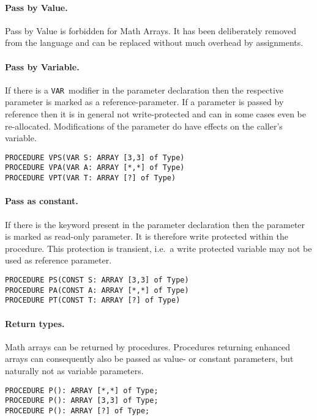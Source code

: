 \documentclass[a4wide,11pt]{article}
\newcommand{\pc}[1]{\makebox{\tt#1}}
\newcommand{\VAR}{\lstinline"VAR"}
\begin{document}
\paragraph{Pass by Value.}
Pass by Value is forbidden for Math Arrays.
It has been deliberately removed from the language and can be replaced without much overhead by assignments.

\paragraph{Pass by Variable.} If there is a \VAR\ modifier in the parameter declaration then  the respective parameter is marked as a reference-parameter.
If a parameter is passed by reference then it is in general not write-protected and can in some cases even be re-allocated.
Modifications of the parameter do have effects on the caller's variable.

\begin{lstlisting}[style=example]
PROCEDURE VPS(VAR S: ARRAY [3,3] of Type)
PROCEDURE VPA(VAR A: ARRAY [*,*] of Type)
PROCEDURE VPT(VAR T: ARRAY [?] of Type)
\end{lstlisting}

\paragraph{Pass as constant.} If there is the \pc{const} keyword present in the parameter declaration then the parameter is marked as read-only parameter.
It is therefore write protected within the procedure.
This protection is transient, i.e.\ a write protected variable may not be used as reference parameter.

\begin{lstlisting}[style=example]
PROCEDURE PS(CONST S: ARRAY [3,3] of Type)
PROCEDURE PA(CONST A: ARRAY [*,*] of Type)
PROCEDURE PT(CONST T: ARRAY [?] of Type)
\end{lstlisting}

\paragraph{Return types.} Math arrays can be returned by procedures.
Procedures returning enhanced arrays can consequently also be passed as value- or constant parameters, but naturally not as variable parameters.

\begin{lstlisting}[style=example,caption=Examples of array return types]
PROCEDURE P(): ARRAY [*,*] of Type;
PROCEDURE P(): ARRAY [3,3] of Type;
PROCEDURE P(): ARRAY [?] of Type;
\end{lstlisting}
\end{document}
